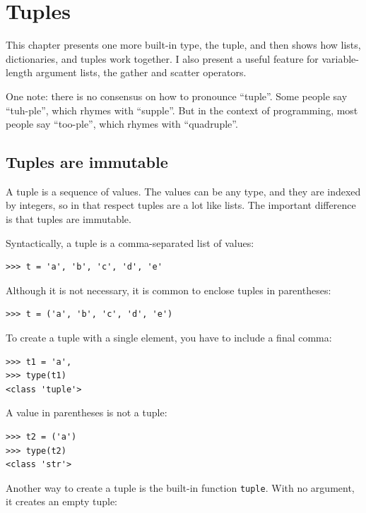 \documentclass[10pt]{book}
\begin{document}
\chapter{Tuples}
\label{tuplechap}

This chapter presents one more built-in type, the tuple, and then
shows how lists, dictionaries, and tuples work together.
I also present a useful feature for variable-length argument lists,
the gather and scatter operators.

One note: there is no consensus on how to pronounce ``tuple''.
Some people say ``tuh-ple'', which rhymes with ``supple''.  But
in the context of programming, most people say ``too-ple'', which
rhymes with ``quadruple''.


\section{Tuples are immutable}

A tuple is a sequence of values.  The values can be any type, and
they are indexed by integers, so in that respect tuples are a lot
like lists.  The important difference is that tuples are immutable.

Syntactically, a tuple is a comma-separated list of values:

\begin{verbatim}
>>> t = 'a', 'b', 'c', 'd', 'e'
\end{verbatim}
%
Although it is not necessary, it is common to enclose tuples in
parentheses:

\begin{verbatim}
>>> t = ('a', 'b', 'c', 'd', 'e')
\end{verbatim}
%
To create a tuple with a single element, you have to include a final
comma:

\begin{verbatim}
>>> t1 = 'a',
>>> type(t1)
<class 'tuple'>
\end{verbatim}
%
A value in parentheses is not a tuple:

\begin{verbatim}
>>> t2 = ('a')
>>> type(t2)
<class 'str'>
\end{verbatim}
%
Another way to create a tuple is the built-in function {\tt tuple}.
With no argument, it creates an empty tuple:
\end{document}

